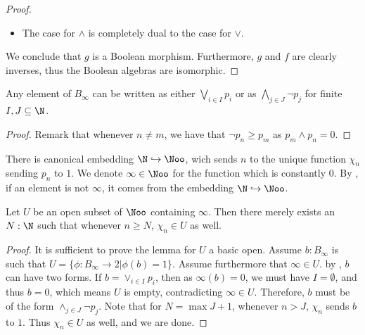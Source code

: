 \begin{proof}
\begin{itemize}
\begin{itemize}
%
%
      \end{itemize}
    \item The case for $\wedge$ is completely dual to the case for $\vee$. 
  \end{itemize}
We conclude that $g$ is a Boolean morphism. 
Furthermore, $g$ and $f$ are clearly inverses, thus the Boolean algebras are isomorphic. 
\end{proof}

  \begin{lemma}\label{lemBinftyNormalForm}
  Any element of $B_\infty$ can be written as 
  either $\bigvee_{i\in I} p_i$  or
  as $\bigwedge_{j\in J} \neg p_j$ 
  for finite $I,J\subseteq \N$. 
\end{lemma}
\begin{proof}
  Remark that whenever $n \neq m$, we have that 
  $\neg p_n \geq p_m$ as $p_m \wedge p_n = 0$. 
\end{proof}
There is canonical embedding $\N \hookrightarrow \Noo$, 
wich sends $n$ to the unique function $\chi_{n}$ sending $p_n$ to $1$. 
We denote $\infty \in \Noo$ for the function which is constantly $0$. 
By , if an element is not $\infty$, 
it comes from the embedding $\N \hookrightarrow \Noo$. 
\begin{lemma}\label{LemmaOpensContainingInfty}
  Let $U$ be an open subset of $\Noo$ containing $\infty$.
  Then there merely exists an $N:\N$ such that whenever $n\geq N$, 
  $\chi_n\in U$ as well. 
\end{lemma}
\begin{proof}
  It is sufficient to prove the lemma for $U$ a basic open. 
  Assume $b : B_\infty $ is such that 
  $U = \{ \phi: B_\infty \to 2| \phi(b) = 1\}$.
  Assume furthermore that $\infty \in U$.
  by , $b$ can have two forms.
  If $b = \vee_{i\in I} p_i$, then as $\infty(b) = 0$, 
  we must have $I = \emptyset$, and thus $b = 0$, 
  which means $U$ is empty, contradicting $\infty\in U$. 
  Therefore, 
  $b$ must be of the form $\wedge_{j \in J} \neg p_j$. 
  Note that for $N = \max J + 1$, whenever $n>J$, 
  $\chi_n$  sends $b$ to $1$. 
  Thus $\chi_n \in U$ as well, and we are done. 
\end{proof}

